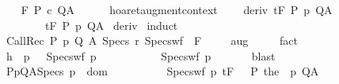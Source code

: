 \begin{isabellebody}
\ \ \isamarkupfalse%
\ {\isachardoublequoteopen}{\isasymGamma}{\isacharcomma}{\isasymTheta}{\isasymTurnstile}\isactrlbsub {\isacharslash}F\isactrlesub \ P\ c\ Q{\isacharcomma}A{\isachardoublequoteclose}\isanewline
\ \ \ \ \isamarkupfalse%
%
\endisatagproof
{\isafoldproof}%
%
\isadelimproof
\isanewline
%
\endisadelimproof
\isanewline
\isanewline
{}\isamarkupfalse%
\ hoaret{\isacharunderscore}augment{\isacharunderscore}context{\isacharcolon}\ \isanewline
\ \ \ deriv{\isacharcolon}\ {\isachardoublequoteopen}{\isasymGamma}{\isacharcomma}{\isasymTheta}{\isasymturnstile}\isactrlsub t\isactrlbsub {\isacharslash}F\isactrlesub \ P\ p\ Q{\isacharcomma}A{\isachardoublequoteclose}\isanewline
\ \ \ {\isachardoublequoteopen}{\isasymAnd}{\isasymTheta}{\isacharprime}{\isachardot}\ {\isasymTheta}\ {\isasymsubseteq}\ {\isasymTheta}{\isacharprime}\ {\isasymLongrightarrow}\ {\isasymGamma}{\isacharcomma}{\isasymTheta}{\isacharprime}{\isasymturnstile}\isactrlsub t\isactrlbsub {\isacharslash}F\isactrlesub \ P\ p\ Q{\isacharcomma}A{\isachardoublequoteclose}\isanewline
%
\isadelimproof
%
\endisadelimproof
%
\isatagproof
{}\isamarkupfalse%
\ deriv\isanewline
{}\isamarkupfalse%
\ {\isacharparenleft}induct{\isacharparenright}\isanewline
\ \ \isamarkupfalse%
\ {\isacharparenleft}CallRec\ P\ p\ Q\ A\ Specs\ r\ Specs{\isacharunderscore}wf\ {\isasymTheta}\ F\ {\isasymTheta}{\isacharprime}{\isacharparenright}\isanewline
\ \ \isamarkupfalse%
\ aug{\isacharcolon}\ {\isachardoublequoteopen}{\isasymTheta}\ {\isasymsubseteq}\ {\isasymTheta}{\isacharprime}{\isachardoublequoteclose}\ \isamarkupfalse%
\ fact\isanewline
\ \ \isamarkupfalse%
\isanewline
\ \ \isamarkupfalse%
\ h{\isacharcolon}\ {\isachardoublequoteopen}{\isasymAnd}{\isasymtau}\ p{\isachardot}\ {\isasymTheta}\ {\isasymunion}\ Specs{\isacharunderscore}wf\ p\ {\isasymtau}\isanewline
\ \ \ \ \ \ \ {\isasymsubseteq}\ {\isasymTheta}{\isacharprime}\ {\isasymunion}\ Specs{\isacharunderscore}wf\ p\ {\isasymtau}{\isachardoublequoteclose}\isanewline
\ \ \ \ \isamarkupfalse%
\ blast\isanewline
\ \ \isamarkupfalse%
\ {\isachardoublequoteopen}{\isasymforall}{\isacharparenleft}P{\isacharcomma}p{\isacharcomma}Q{\isacharcomma}A{\isacharparenright}{\isasymin}Specs{\isachardot}\ p\ {\isasymin}\ dom\ {\isasymGamma}\ {\isasymand}\isanewline
\ \ \ \ \ {\isacharparenleft}{\isasymforall}{\isasymtau}{\isachardot}\ {\isasymGamma}{\isacharcomma}{\isasymTheta}\ {\isasymunion}\ Specs{\isacharunderscore}wf\ p\ {\isasymtau}{\isasymturnstile}\isactrlsub t\isactrlbsub {\isacharslash}F\isactrlesub \ {\isacharparenleft}{\isacharbraceleft}{\isasymtau}{\isacharbraceright}\ {\isasyminter}\ P{\isacharparenright}\ {\isacharparenleft}the\ {\isacharparenleft}{\isasymGamma}\ p{\isacharparenright}{\isacharparenright}\ Q{\isacharcomma}A\ {\isasymand}\isanewline

\end{isabellebody}
